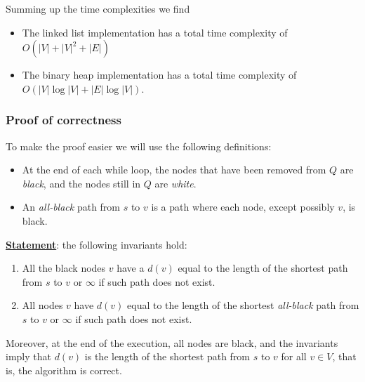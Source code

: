\documentclass[10pt]{extarticle}
\begin{document}
Summing up the time complexities we find

\begin{itemize}
    \item The linked list implementation has a total time complexity of $O(|V| + |V|^2 + |E|)$
    \item The binary heap implementation has a total time complexity of $O(|V| \log |V| + |E| \log |V|)$.
\end{itemize}

\subsubsection{Proof of correctness}

To make the proof easier we will use the following definitions:
\begin{itemize}
    \item At the end of each while loop, the nodes that have been removed from $Q$ are \textit{black}, and the nodes still in $Q$ are \textit{white}.
    \item An \textit{all-black} path from $s$ to $v$ is a path where each node, except possibly $v$, is black.
\end{itemize}

\textbf{\underline{Statement}}: the following invariants hold:

\begin{enumerate}[label=\roman*]
    \item All the black nodes $v$ have a $d(v)$ equal to the length of the shortest path from $s$ to $v$ or $\infty$ if such path does not exist.
    \item All nodes $v$ have $d(v)$ equal to the length of the shortest \textit{all-black} path from $s$ to $v$ or $\infty$ if such path does not exist.
\end{enumerate}

Moreover, at the end of the execution, all nodes are black, and the invariants imply that $d(v)$ is the length of the shortest path from $s$ to $v$ for all $v \in V$, that is, the algorithm is correct.
\end{document}
